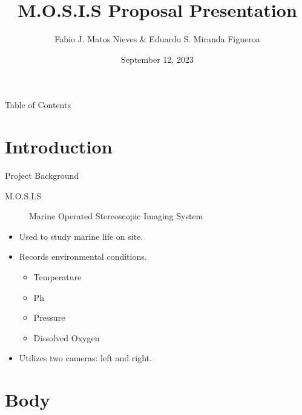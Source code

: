 \documentclass[14pt, aspectratio=169]{beamer}
\title{M.O.S.I.S Proposal Presentation}
\author{Fabio J. Matos Nieves \& Eduardo S. Miranda Figueroa }
\institute{Univerity of Puerto Rico Mayagüez Campus}
\date{September 12, 2023}
\begin{document}
\begin{frame}
	\maketitle
\end{frame}

\begin{frame}{Table of Contents}
	\tableofcontents
\end{frame}
\section{Introduction}
\begin{frame}{Project Background}
	\begin{description}
		\item[M.O.S.I.S] Marine Operated Stereoscopic Imaging System
	\end{description}
	\begin{itemize}
		\item Used to study marine life on site.
		\item Records environmental conditions.
		      \begin{itemize}
			      \item Temperature
			      \item Ph
			      \item Pressure
			      \item Dissolved Oxygen
		      \end{itemize}
		\item Utilizes two cameras: left and right.
	\end{itemize}
\end{frame}
\section{Body}
\end{document}

